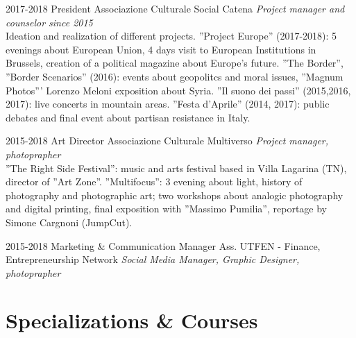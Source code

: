 \documentclass[]{friggeri-cv}
\begin{document}
\begin{entrylist}

\entry
    {2017-2018}
    {President}
    {Associazione Culturale Social Catena}
    {\emph{Project manager and counselor since 2015}\\
    Ideation and realization of different projects. ''Project Europe'' (2017-2018): 5 evenings about European Union, 4 days visit to European Institutions in Brussels, creation of a political magazine about Europe's future. ''The Border'', ''Border Scenarios'' (2016): events about geopolitcs and moral issues, ''Magnum Photos''' Lorenzo Meloni exposition about Syria. ''Il suono dei passi'' (2015,2016, 2017): live concerts in mountain areas. ''Festa d’Aprile'' (2014, 2017): public debates and final event about partisan resistance in Italy.
    }

\entry
    {2015-2018}
    {Art Director}
    {Associazione Culturale Multiverso}
    {\emph{Project manager, photoprapher}\\
    ''The Right Side Festival'': music and arts festival based in Villa Lagarina (TN), director of ''Art Zone''. ''Multifocus'': 3 evening about light, history of photography and photographic art; two workshops about analogic photography and digital printing, final exposition with ''Massimo Pumilia'', reportage by Simone Cargnoni (JumpCut).
    }

\entry
    {2015-2018}
    {Marketing \& Communication Manager}
    {Ass. UTFEN - Finance, Entrepreneurship Network}
    {\emph{Social Media Manager, Graphic Designer, photoprapher}}

\end{entrylist}


\section{Specializations \& Courses}
\end{document}
